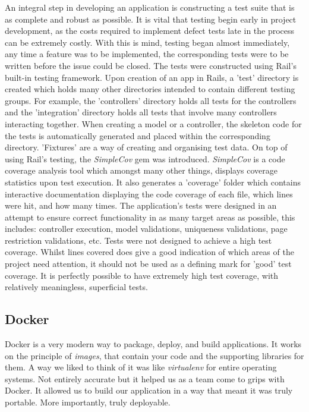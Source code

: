 \documentclass{l3proj}
\begin{document}
An integral step in developing an application is constructing a test suite that is as complete and robust as possible. It is vital that testing begin early in project development, as the costs required to implement defect tests late in the process can be extremely costly. With this is mind, testing began almost immediately, any time a feature was to be implemented, the corresponding tests were to be written before the issue could be closed. The tests were constructed using Rail's built-in testing framework. Upon creation of an app in Rails, a 'test' directory is created which holds many other directories intended to contain different testing groups. For example, the 'controllers' directory holds all tests for the controllers and the 'integration' directory holds all tests that involve many controllers interacting together. When creating a model or a controller, the skeleton code for the tests is automatically generated and placed within the corresponding directory. 'Fixtures' are a way of creating and organising test data. On top of using Rail's testing, the \textit{SimpleCov} gem was introduced. \textit{SimpleCov} is a code coverage analysis tool which amongst many other things, displays coverage statistics upon test execution. It also generates a 'coverage' folder which contains interactive documentation displaying the code coverage of each file, which lines were hit, and how many times. The application's tests were designed in an attempt to ensure correct functionality in as many target areas as possible, this includes: controller execution, model validations, uniqueness validations, page restriction validations, etc. Tests were not designed to achieve a high test coverage. Whilst lines covered does give a good indication of which areas of the project need attention, it should not be used as a defining mark for 'good' test coverage. It is perfectly possible to have extremely high test coverage, with relatively meaningless, superficial tests.


\subsection{Docker}
\label{sec:docker}

Docker is a very modern way to package, deploy, and build applications. It works on the principle of \textit{images}, that contain your code and the supporting libraries for them. A way we liked to think of it was like \textit{virtualenv} for entire operating systems. Not entirely accurate but it helped us as a team come to grips with Docker. It allowed us to build our application in a way that meant it was truly portable. More importantly, truly deployable.
\end{document}
